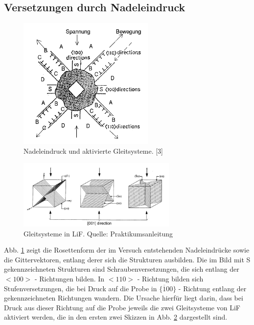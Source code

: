     \subsection{Versetzungen durch Nadeleindruck}
	\begin{figure}[H]
            \centering
            \includegraphics[width=0.6\textwidth]{Images/Question3.PNG}
            \caption{Nadeleindruck und aktivierte Gleitsysteme. [3]}
            \label{FigNadel}
        \end{figure}

	\begin{figure}[H]
            \centering
            \includegraphics[width=0.7\textwidth]{Images/Gleitsysteme.JPG}
            \caption{Gleitsysteme in LiF. Quelle: Praktikumsanleitung}
            \label{FigGleitGel}
        \end{figure}
	
	Abb. \ref{FigNadel} zeigt die Rosettenform der im Versuch entstehenden Nadeleindrücke sowie die Gittervektoren, entlang derer sich die Strukturen ausbilden. 
	Die im Bild mit S gekennzeichneten Strukturen sind Schraubenversetzungen, die sich entlang der $<100>$ - Richtungen bilden. In $<110>$ - Richtung bilden sich
	Stufenversetzungen, die bei Druck auf die Probe in $\{ \overline{1}00\}$ - Richtung entlang der gekennzeichneten Richtungen wandern. Die Ursache hierfür liegt
	darin, dass bei Druck aus dieser Richtung auf die Probe jeweils die zwei Gleitsysteme von LiF aktiviert werden, die in den ersten zwei Skizzen in Abb. 
	\ref{FigGleitGel} dargestellt sind.
	


